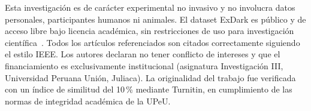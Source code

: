 Esta investigaci\'on es de car\'acter experimental no invasivo y
no involucra datos personales, participantes humanos ni animales.
El dataset ExDark es p\'ublico y de acceso libre bajo licencia
acad\'emica, sin restricciones de uso para investigaci\'on
cient\'{i}fica~\cite{Loh2019}. Todos los art\'{i}culos referenciados
son citados correctamente siguiendo el estilo IEEE. Los autores
declaran no tener conflicto de intereses y que el financiamiento
es exclusivamente institucional (asignatura Investigaci\'on III,
Universidad Peruana Uni\'on, Juliaca). La originalidad del trabajo
fue verificada con un \'{i}ndice de similitud del 10\,\% mediante
Turnitin, en cumplimiento de las normas de integridad acad\'emica
de la UPeU.
